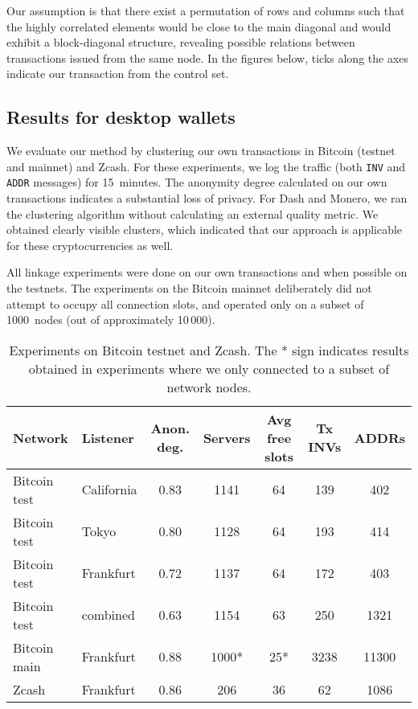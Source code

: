 Our assumption is that there exist a permutation of rows and columns such that the highly correlated elements would be close to the main diagonal and would exhibit a block-diagonal structure, revealing possible relations between transactions issued from the same node.
In the figures below, ticks along the axes indicate our transaction from the control set.


\subsection{Results for desktop wallets}

We evaluate our method by clustering our own transactions in Bitcoin (testnet and mainnet) and Zcash.
For these experiments, we log the traffic (both \texttt{INV} and \texttt{ADDR} messages) for 15~minutes.
The anonymity degree calculated on our own transactions indicates a substantial loss of privacy.
For Dash and Monero, we ran the clustering algorithm without calculating an external quality metric.
We obtained clearly visible clusters, which indicated that our approach is applicable for these cryptocurrencies as well.

All linkage experiments were done on our own transactions and when possible on the testnets.
The experiments on the Bitcoin mainnet deliberately did not attempt to occupy all connection slots, and operated only on a subset of 1000~nodes (out of approximately 10\,000).

\begin{table*}[!t]
	\normalsize
	\caption{Experiments on Bitcoin testnet and Zcash. The * sign indicates results obtained in experiments where we only connected to a subset of network nodes.}
	\centering
	\begin{tabular}{ | l | l | c | c | c | c | c | }
		\hline
		Network & Listener & Anon. deg. & Servers & Avg free slots & Tx INVs & ADDRs \\
		\hline
		Bitcoin test & California & 0.83 & 1141 & 64 & 139 & 402 \\
		Bitcoin test & Tokyo & 0.80 & 1128 & 64 & 193 & 414 \\
		Bitcoin test & Frankfurt & 0.72 & 1137 & 64 & 172 & 403 \\
		Bitcoin test & combined & 0.63 & 1154 & 63 & 250 & 1321 \\
		Bitcoin main & Frankfurt & 0.88 & 1000* & 25* & 3238 & 11300 \\
		Zcash & Frankfurt & 0.86 & 206 & 36 & 62 & 1086 \\
		\hline
	\end{tabular}
	\label{tab:results}
\end{table*}

